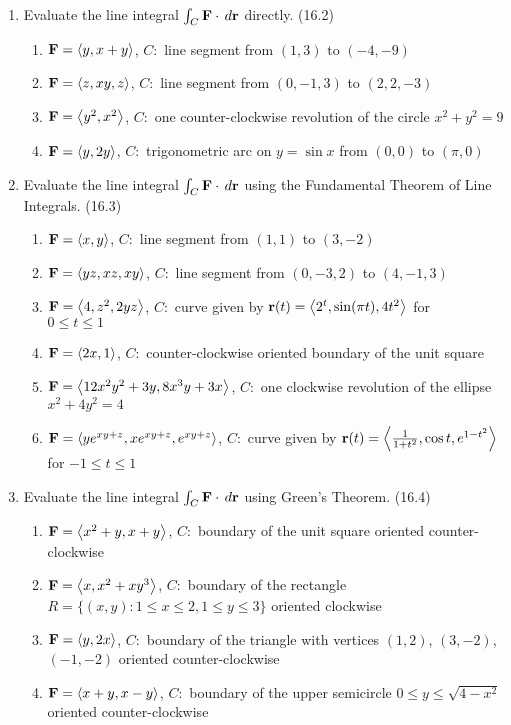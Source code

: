 \begin{enumerate}
    \item Evaluate the line integral $\int_C \mathbf{F}\cdot\,d{\mathbf{r}}$ directly. (16.2)

      \begin{enumerate}
        \item $\mathbf{F}=\left<y,x+y\right>$, $C:$ line segment from $(1,3)$ to $(-4,-9)$
        \item $\mathbf{F}=\left<z,xy,z\right>$, $C:$ line segment from $(0,-1,3)$ to $(2,2,-3)$
        \item $\mathbf{F}=\left<y^2,x^2\right>$, $C:$ one counter-clockwise revolution of the circle $x^2+y^2=9$
        \item $\mathbf{F}=\left<y,2y\right>$, $C:$ trigonometric arc on $y=\sin x$ from $(0,0)$ to $(\pi,0)$
      \end{enumerate}

    \item Evaluate the line integral $\int_C \mathbf{F}\cdot\,d{\mathbf{r}}$ using the Fundamental Theorem of Line Integrals. (16.3)

      \begin{enumerate}
        \item $\mathbf{F}=\left<x,y\right>$, $C:$ line segment from $(1,1)$ to $(3,-2)$
        \item $\mathbf{F}=\left<yz,xz,xy\right>$, $C:$ line segment from $(0,-3,2)$ to $(4,-1,3)$
        \item $\mathbf{F}=\left<4,z^2,2yz\right>$, $C:$ curve given by $\mathbf{r}(t)=\left<2^t,\sin (\pi t),4t^2\right>$ for \\ $0\leq t\leq 1$
        \item $\mathbf{F}=\left<2x,1\right>$, $C:$ counter-clockwise oriented boundary of the unit square
        \item $\mathbf{F}=\left<12x^2y^2+3y,8x^3y+3x\right>$, $C:$ one clockwise revolution of the ellipse $x^2+4y^2=4$
        \item $\mathbf{F}=\left<ye^{xy+z},xe^{xy+z},e^{xy+z}\right>$, $C:$ curve given by $\mathbf{r}(t)=\left<\frac{1}{1+t^2},\cos t,e^{1-t^2}\right>$ \\ for $-1 \leq t \leq 1$
      \end{enumerate}

    \newpage

    \item Evaluate the line integral $\int_C \mathbf{F}\cdot\,d{\mathbf{r}}$ using Green's Theorem. (16.4)

      \begin{enumerate}
        \item $\mathbf{F}=\left<x^2+y,x+y\right>$, $C:$ boundary of the unit square oriented counter-clockwise
        \item $\mathbf{F}=\left<x,x^2+xy^3\right>$, $C:$ boundary of the rectangle \\$R = \{(x,y) : 1\leq x\leq 2, 1\leq y \leq 3\}$ oriented clockwise
        \item $\mathbf{F}=\left<y,2x\right>$, $C:$ boundary of the triangle with vertices $(1,2)$, $(3,-2)$, $(-1,-2)$ oriented counter-clockwise
        \item $\mathbf{F}=\left<x+y,x-y\right>$, $C:$ boundary of the upper semicircle $0\leq y\leq \sqrt{4-x^2}$ oriented counter-clockwise
      \end{enumerate}


\end{enumerate}
